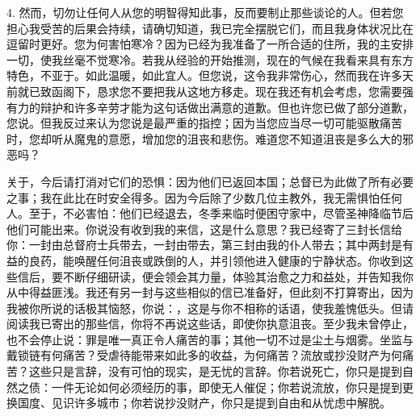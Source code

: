 4. 然而，切勿让任何人从您的明智得知此事，反而要制止那些谈论的人。但若您担心我受苦的后果会持续，请确切知道，我已完全摆脱它们，而且我身体状况比在逗留时更好。您为何害怕寒冷？因为已经为我准备了一所合适的住所，我的主安排一切，使我丝毫不觉寒冷。若我从经验的开始推测，现在的气候在我看来具有东方特色，不亚于。如此温暖，如此宜人。但您说，这令我非常伤心，然而我在许多天前就已致函阁下，恳求您不要把我从这地方移走。现在我还有机会考虑，您需要强有力的辩护和许多辛劳才能为这句话做出满意的道歉。但也许您已做了部分道歉，您说。但我反过来认为您说是最严重的指控；因为当您应当尽一切可能驱散痛苦时，您却听从魔鬼的意愿，增加您的沮丧和悲伤。难道您不知道沮丧是多么大的邪恶吗？\par

关于，今后请打消对它们的恐惧：因为他们已返回本国；总督已为此做了所有必要之事；我在此比在时安全得多。因为今后除了少数几位主教外，我无需惧怕任何人。至于，不必害怕：他们已经退去，冬季来临时便困守家中，尽管圣神降临节后他们可能出来。你说没有收到我的来信，这是什么意思？我已经寄了三封长信给你：一封由总督府士兵带去，一封由带去，第三封由我的仆人带去；其中两封是有益的良药，能唤醒任何沮丧或跌倒的人，并引领他进入健康的宁静状态。你收到这些信后，要不断仔细研读，便会领会其力量，体验其治愈之力和益处，并告知我你从中得益匪浅。我还有另一封与这些相似的信已准备好，但此刻不打算寄出，因为我被你所说的话极其恼怒，你说：，这是与你不相称的话语，使我羞愧低头。但请阅读我已寄出的那些信，你将不再说这些话，即使你执意沮丧。至少我未曾停止，也不会停止说：罪是唯一真正令人痛苦的事；其他一切不过是尘土与烟雾。坐监与戴锁链有何痛苦？受虐待能带来如此多的收益，为何痛苦？流放或抄没财产为何痛苦？这些只是言辞，没有可怕的现实，是无忧的言辞。你若说死亡，你只是提到自然之债：一件无论如何必须经历的事，即使无人催促；你若说流放，你只是提到更换国度、见识许多城市；你若说抄没财产，你只是提到自由和从忧虑中解脱。\par

